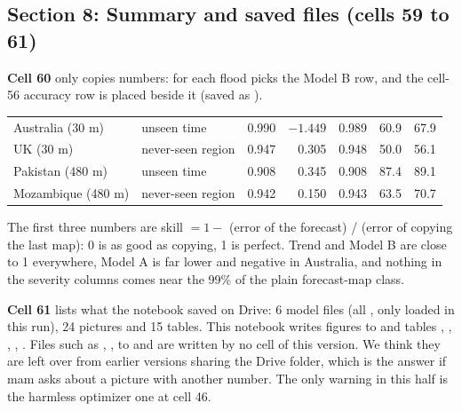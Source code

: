 
\subsection{Section 8: Summary and saved files (cells 59 to 61)}
\textbf{Cell 60} only copies numbers: for each flood  picks the Model B row, and the cell-56 accuracy row is placed beside it (saved as ).
\begin{center}
\small
\begin{tabularx}{\linewidth}{|l|l|r|r|r|Y|Y|}
\hline
{}  &  &  &  &  &  & \\ \hline
Australia (30 m) & unseen time & 0.990 & $-1.449$ & 0.989 & 60.9 & 67.9\\ \hline
UK (30 m) & never-seen region & 0.947 & 0.305 & 0.948 & 50.0 & 56.1\\ \hline
Pakistan (480 m) & unseen time & 0.908 & 0.345 & 0.908 & 87.4 & 89.1\\ \hline
Mozambique (480 m) & never-seen region & 0.942 & 0.150 & 0.943 & 63.5 & 70.7\\ \hline
\end{tabularx}
\end{center}
The first three numbers are skill $=1-$ (error of the forecast) / (error of copying the last map): 0 is as good as copying, 1 is perfect. Trend and Model B are close to 1 everywhere, Model A is far lower and negative in Australia, and nothing in the severity columns comes near the 99\% of the plain forecast-map class.

\textbf{Cell 61} lists what the notebook saved on Drive: 6 model files (all , only loaded in this run), 24 pictures and 15 tables. This notebook writes figures  to  and tables , , , , . Files such as , ,  to  and  are written by no cell of this version. We think they are left over from earlier versions sharing the Drive folder, which is the answer if mam asks about a picture with another number. The only warning in this half is the harmless optimizer one at cell 46.

